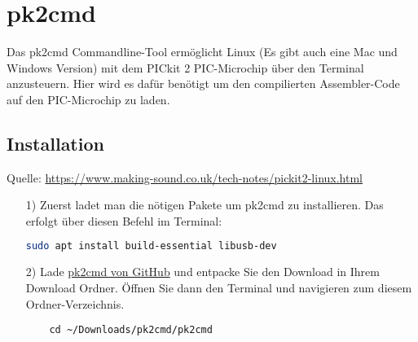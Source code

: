 \section{pk2cmd}
\label{sec:pk2cmd}
Das {\ttfamily pk2cmd} Commandline-Tool ermöglicht Linux (Es gibt auch eine Mac und Windows Version) mit dem PICkit 2 PIC-Microchip über den Terminal anzusteuern. Hier wird es dafür benötigt um den compilierten Assembler-Code auf den PIC-Microchip zu laden.

\subsection{Installation}
\label{sub:installation}
Quelle: \url{https://www.making-sound.co.uk/tech-notes/pickit2-linux.html}\\

\begin{itemize}
    \item[1)] Zuerst ladet man die nötigen Pakete um {\ttfamily pk2cmd} zu installieren. Das erfolgt über diesen Befehl im Terminal:
    \begin{lstlisting}[language=bash]
    sudo apt install build-essential libusb-dev
    \end{lstlisting}
    \item[2)] Lade \href{https://github.com/psmay/pk2cmd}{pk2cmd von GitHub} und entpacke Sie den Download in Ihrem Download Ordner. Öffnen Sie dann den Terminal und navigieren zum diesem Ordner-Verzeichnis.
    \begin{lstlisting}
    cd ~/Downloads/pk2cmd/pk2cmd
    \end{lstlisting}
    

\end{itemize}
